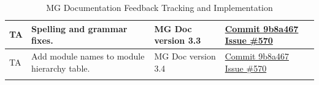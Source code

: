 \documentclass{article}
\begin{document}
\begin{longtable}{|p{2cm}|p{4.5cm}|p{3.5cm}|p{3cm}|}
    TA &
    Spelling and grammar fixes. &
    MG Doc version 3.3 & 
    \href{https://github.com/Team6-SixSense/audio360/commit/9b8a467}{Commit
        9b8a467}
    \newline
    \href{https://github.com/Team6-SixSense/audio360/issues/570}{Issue \#570} \\
    \hline

    TA &
    Add module names to module hierarchy table. &
    MG Doc version 3.4 & 
    \href{https://github.com/Team6-SixSense/audio360/commit/9b8a467}{Commit
        9b8a467}
    \newline
    \href{https://github.com/Team6-SixSense/audio360/issues/570}{Issue \#570} \\
    \hline

    \caption{MG Documentation Feedback Tracking and Implementation}
\end{longtable}
\end{document}
